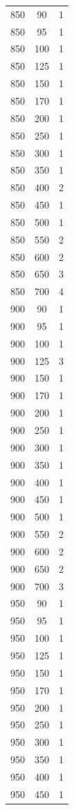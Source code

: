 \begin{longtable}{c c c}
850 & 90 & 1 \\
850 & 95 & 1 \\
850 & 100 & 1 \\
850 & 125 & 1 \\
850 & 150 & 1 \\
850 & 170 & 1 \\
850 & 200 & 1 \\
850 & 250 & 1 \\
850 & 300 & 1 \\
850 & 350 & 1 \\
850 & 400 & 2 \\
850 & 450 & 1 \\
850 & 500 & 1 \\
850 & 550 & 2 \\
850 & 600 & 2 \\
850 & 650 & 3 \\
850 & 700 & 4 \\
900 & 90 & 1 \\
900 & 95 & 1 \\
900 & 100 & 1 \\
900 & 125 & 3 \\
900 & 150 & 1 \\
900 & 170 & 1 \\
900 & 200 & 1 \\
900 & 250 & 1 \\
900 & 300 & 1 \\
900 & 350 & 1 \\
900 & 400 & 1 \\
900 & 450 & 1 \\
900 & 500 & 1 \\
900 & 550 & 2 \\
900 & 600 & 2 \\
900 & 650 & 2 \\
900 & 700 & 3 \\
950 & 90 & 1 \\
950 & 95 & 1 \\
950 & 100 & 1 \\
950 & 125 & 1 \\
950 & 150 & 1 \\
950 & 170 & 1 \\
950 & 200 & 1 \\
950 & 250 & 1 \\
950 & 300 & 1 \\
950 & 350 & 1 \\
950 & 400 & 1 \\
950 & 450 & 1 \\

\end{longtable}
